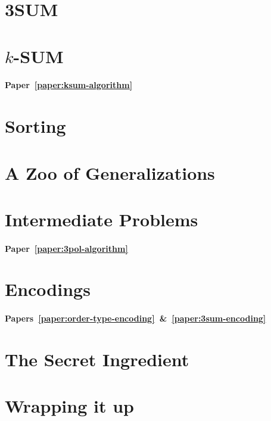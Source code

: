 \section*{3SUM}


\section*{\(k\)-SUM}

\paragraph{Paper~\ref{paper:ksum-algorithm}}


\section*{Sorting}


\section*{A Zoo of Generalizations}





\section*{Intermediate Problems}

\paragraph{Paper~\ref{paper:3pol-algorithm}}


\section*{Encodings}

\paragraph{Papers~\ref{paper:order-type-encoding}~\&~\ref{paper:3sum-encoding}}


\section*{The Secret Ingredient}


\section*{Wrapping it up}

